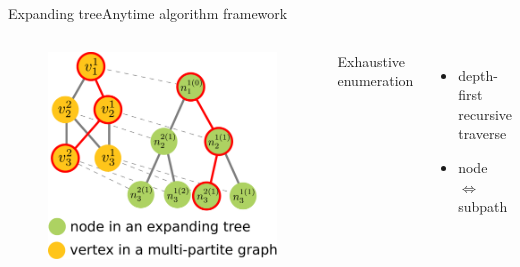 \begin{frame}{Expanding tree}{Anytime algorithm framework}

\begin{columns}

\begin{minipage}{\textwidth}
\begin{figure}
\centering
\includegraphics[width=.9\textwidth]{./figure/multipartite_expandingtree}
\end{figure}
\end{minipage}


\begin{minipage}{\textwidth}

Exhaustive enumeration

\begin{itemize}
\item depth-first recursive traverse
\item node $ \Longleftrightarrow $ subpath
\end{itemize}
\end{minipage}

\end{columns}

\end{frame}

